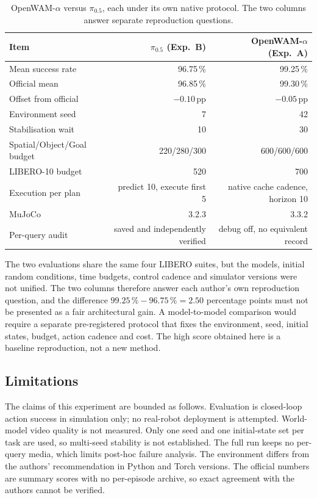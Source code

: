 \begin{table}[H]
  \centering
  \small
  \caption{OpenWAM-$\alpha$ versus $\pi_{0.5}$, each under its own native
  protocol. The two columns answer separate reproduction questions.}
  \label{tab:owa-vs-pi05}
  \begin{tabular}{@{}lrr@{}}
    \toprule
    Item & $\pi_{0.5}$ (Exp.~B) & OpenWAM-$\alpha$ (Exp.~A) \\
    \midrule
    Mean success rate        & 96.75\,\% & 99.25\,\% \\
    Official mean            & 96.85\,\% & 99.30\,\% \\
    Offset from official     & $-0.10$\,pp & $-0.05$\,pp \\
    Environment seed         & 7   & 42 \\
    Stabilisation wait       & 10  & 30 \\
    Spatial/Object/Goal budget & 220/280/300 & 600/600/600 \\
    LIBERO-10 budget         & 520 & 700 \\
    Execution per plan       & predict 10, execute first 5 & native cache cadence, horizon 10 \\
    MuJoCo                   & 3.2.3 & 3.3.2 \\
    Per-query audit          & saved and independently verified & debug off, no equivalent record \\
    \bottomrule
  \end{tabular}
\end{table}

The two evaluations share the same four LIBERO suites, but the models, initial
random conditions, time budgets, control cadence and simulator versions were
not unified. The two columns therefore answer each author's own reproduction
question, and the difference $99.25\,\% - 96.75\,\% = 2.50$ percentage points
must not be presented as a fair architectural gain. A model-to-model comparison
would require a separate pre-registered protocol that fixes the environment,
seed, initial states, budget, action cadence and cost. The high score obtained
here is a baseline reproduction, not a new method.

\subsection{Limitations}
\label{sec:owa-limitations}

The claims of this experiment are bounded as follows. Evaluation is closed-loop
action success in simulation only; no real-robot deployment is attempted.
World-model video quality is not measured. Only one seed and one initial-state
set per task are used, so multi-seed stability is not established. The full run
keeps no per-query media, which limits post-hoc failure analysis. The
environment differs from the authors' recommendation in Python and Torch
versions. The official numbers are summary scores with no per-episode archive,
so exact agreement with the authors cannot be verified.

